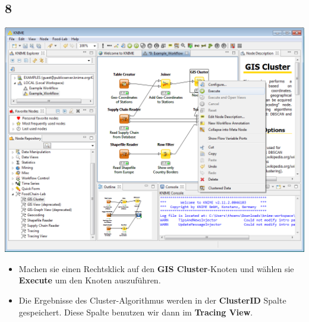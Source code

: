 \documentclass{beamer}
\begin{document}
\subsection{8}
\begin{frame}
	\begin{center}
  		\includegraphics[height=0.6\textheight]{8.png}
	\end{center}
	\begin{itemize}
		\item Machen sie einen Rechtsklick auf den \textbf{GIS Cluster}-Knoten und wählen sie \textbf{Execute} um den Knoten auszuführen.
		\item Die Ergebnisse des Cluster-Algorithmus werden in der \textbf{ClusterID} Spalte gespeichert. Diese Spalte benutzen wir dann im \textbf{Tracing View}.
	\end{itemize}
\end{frame}
\end{document}
